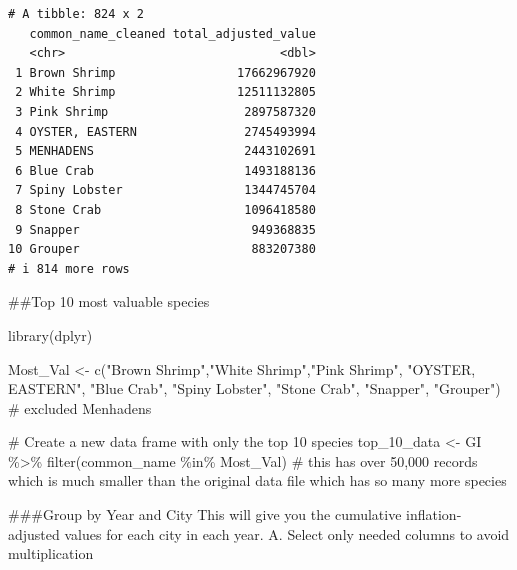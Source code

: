 \documentclass[
  letterpaper,
  DIV=11,
  numbers=noendperiod]{scrartcl}
\newenvironment{Shaded}{\begin{snugshade}}{\end{snugshade}}
\newcommand{\CommentTok}[1]{\textcolor[rgb]{0.37,0.37,0.37}{#1}}
\newcommand{\FunctionTok}[1]{\textcolor[rgb]{0.28,0.35,0.67}{#1}}
\newcommand{\NormalTok}[1]{\textcolor[rgb]{0.00,0.23,0.31}{#1}}
\newcommand{\OtherTok}[1]{\textcolor[rgb]{0.00,0.23,0.31}{#1}}
\newcommand{\SpecialCharTok}[1]{\textcolor[rgb]{0.37,0.37,0.37}{#1}}
\newcommand{\StringTok}[1]{\textcolor[rgb]{0.13,0.47,0.30}{#1}}
\begin{document}
\begin{verbatim}
# A tibble: 824 x 2
   common_name_cleaned total_adjusted_value
   <chr>                              <dbl>
 1 Brown Shrimp                 17662967920
 2 White Shrimp                 12511132805
 3 Pink Shrimp                   2897587320
 4 OYSTER, EASTERN               2745493994
 5 MENHADENS                     2443102691
 6 Blue Crab                     1493188136
 7 Spiny Lobster                 1344745704
 8 Stone Crab                    1096418580
 9 Snapper                        949368835
10 Grouper                        883207380
# i 814 more rows
\end{verbatim}

\#\#Top 10 most valuable species

\begin{Shaded}
\begin{Highlighting}[]
\FunctionTok{library}\NormalTok{(dplyr)}

\NormalTok{Most\_Val }\OtherTok{\textless{}{-}} \FunctionTok{c}\NormalTok{(}\StringTok{"Brown Shrimp"}\NormalTok{,}\StringTok{"White Shrimp"}\NormalTok{,}\StringTok{"Pink Shrimp"}\NormalTok{, }\StringTok{"OYSTER, EASTERN"}\NormalTok{, }\StringTok{"Blue Crab"}\NormalTok{, }\StringTok{"Spiny Lobster"}\NormalTok{, }\StringTok{"Stone Crab"}\NormalTok{, }\StringTok{"Snapper"}\NormalTok{, }\StringTok{"Grouper"}\NormalTok{) }\CommentTok{\# excluded Menhadens}

\CommentTok{\# Create a new data frame with only the top 10 species}
\NormalTok{top\_10\_data }\OtherTok{\textless{}{-}}\NormalTok{ GI }\SpecialCharTok{\%\textgreater{}\%}
  \FunctionTok{filter}\NormalTok{(common\_name }\SpecialCharTok{\%in\%}\NormalTok{ Most\_Val) }\CommentTok{\# this has over 50,000 records which is much smaller than the original data file which has so many more species}
\end{Highlighting}
\end{Shaded}

\#\#\#Group by Year and City This will give you the cumulative
inflation-adjusted values for each city in each year. A. Select only
needed columns to avoid multiplication
\end{document}
